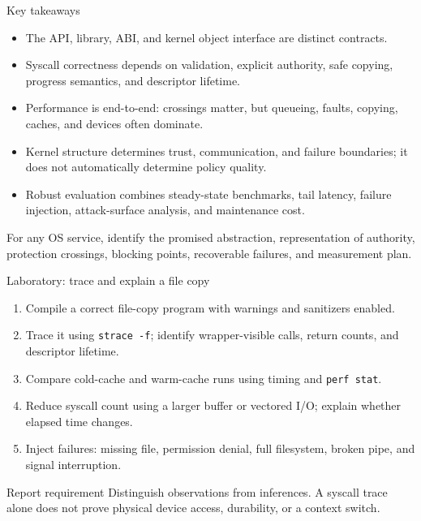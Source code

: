 \documentclass[aspectratio=169,11pt]{beamer}
\newcommand{\code}[1]{\texttt{#1}}
\begin{document}
\begin{frame}{Key takeaways}
  \begin{itemize}
    \item The API, library, ABI, and kernel object interface are distinct contracts.
    \item Syscall correctness depends on validation, explicit authority, safe copying, progress semantics, and descriptor lifetime.
    \item Performance is end-to-end: crossings matter, but queueing, faults, copying, caches, and devices often dominate.
    \item Kernel structure determines trust, communication, and failure boundaries; it does not automatically determine policy quality.
    \item Robust evaluation combines steady-state benchmarks, tail latency, failure injection, attack-surface analysis, and maintenance cost.
  \end{itemize}
  \begin{tcolorbox}[title=Transfer question,colback=osgreen!5,colframe=osgreen!65]
    For any OS service, identify the promised abstraction, representation of authority, protection crossings, blocking points, recoverable failures, and measurement plan.
  \end{tcolorbox}
\end{frame}

\begin{frame}{Laboratory: trace and explain a file copy}
  \begin{enumerate}
    \item Compile a correct file-copy program with warnings and sanitizers enabled.
    \item Trace it using \code{strace -f}; identify wrapper-visible calls, return counts, and descriptor lifetime.
    \item Compare cold-cache and warm-cache runs using timing and \code{perf stat}.
    \item Reduce syscall count using a larger buffer or vectored I/O; explain whether elapsed time changes.
    \item Inject failures: missing file, permission denial, full filesystem, broken pipe, and signal interruption.
  \end{enumerate}
  \begin{alertblock}{Report requirement}
    Distinguish observations from inferences. A syscall trace alone does not prove physical device access, durability, or a context switch.
  \end{alertblock}
\end{frame}
\end{document}
